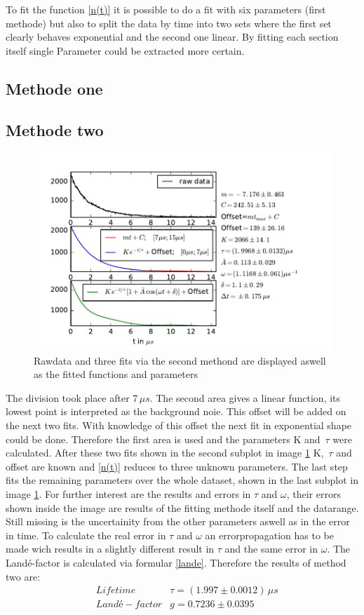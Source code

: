 \documentclass{include/thesisclass3}
\newcommand{\e}[1]{\,\si{#1}}
\begin{document}
To fit the function \ref{n(t)} it is possible to do a fit with six parameters (first methode) but also to split the data by time into two sets where the first set clearly behaves exponential and the second one linear. By fitting each section itself single Parameter could be extracted more certain. 
\subsection{Methode one}
\subsection{Methode two}
\begin{figure}[hb]
	\begin{center}
		\includegraphics[width=1\textwidth]{images/plot.pdf}
		\caption{Rawdata and three fits via the second methond are displayed aswell as the fitted functions and parameters}
		\label{method2}
	\end{center}
\end{figure}
The division took place after 7$\e{\mu s}$. The second area gives a linear function, its lowest point is interpreted as the background noie. This offset will be added on the next two fits. With knowledge of this offset the next fit in exponential shape could be done. Therefore the first area is used and the parameters K and $\e{\tau}$ were calculated. After these two fits shown in the second subplot in image \ref{method2} K, $\e{\tau}$ and offset are known and \ref{n(t)} reduces to three unknown parameters. The last step fits the remaining parameters over the whole dataset, shown in the last subplot in image \ref{method2}. For further interest are the results and errors in $\tau$ and $\omega$, their errors shown inside the image are results of the fitting methode itself and the datarange. Still missing is the uncertainity from the other parameters aswell as in the error in time. To calculate the real error in $\tau$ and $\omega$ an errorpropagation has to be made wich results in a slightly different result in $\tau$ and the same error in $\omega$. The Landé-factor is calculated via formular \ref{lande}. Therefore the results of method two are:
\begin{align}
&\e{Lifetime} &\tau=(1.997\pm 0.0012)\e{\mu s}\\
&\e{Landé-factor} &g=0.7236 \pm 0.0395
\end{align}
\end{document}
